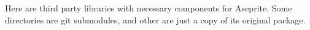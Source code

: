 Here are third party libraries with necessary components for Aseprite. Some directories are git submodules, and other are just a copy of its original package. 